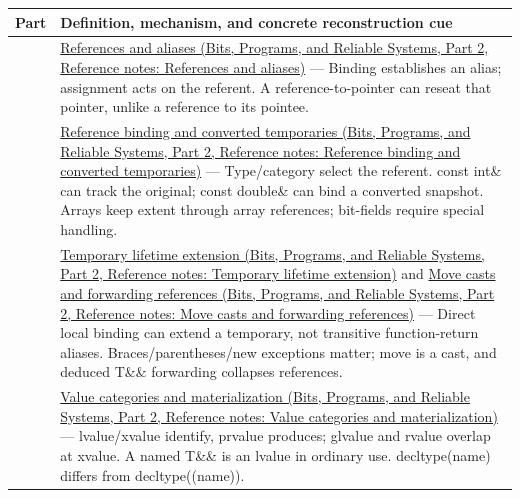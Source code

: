 {\def\LTcaptype{none} %
\begin{longtable}[]{@{}
  >{\raggedright\arraybackslash}p{}
  >{\raggedright\arraybackslash}p{}@{}}
\toprule\noalign{}
\begin{minipage}[b]{\linewidth}\raggedright
Part
\end{minipage} & \begin{minipage}[b]{\linewidth}\raggedright
Definition, mechanism, and concrete reconstruction cue
\end{minipage} \\
\midrule\noalign{}
\endhead
\bottomrule\noalign{}
\endlastfoot
113 & \href{../01-Bits-Programs-and-Reliable-Systems-P02/main.pdf\#nameddest=appendix-d6d562ca9fbb}{References and aliases (Bits, Programs, and Reliable Systems, Part 2, Reference notes: References and aliases)} --- Binding establishes an alias; assignment acts on the referent. A reference-to-pointer can reseat that pointer, unlike a reference to its pointee. \\
114 & \href{../01-Bits-Programs-and-Reliable-Systems-P02/main.pdf\#nameddest=appendix-37856d997bb0}{Reference binding and converted temporaries (Bits, Programs, and Reliable Systems, Part 2, Reference notes: Reference binding and converted temporaries)} --- Type/category select the referent. const int\& can track the original; const double\& can bind a converted snapshot. Arrays keep extent through array references; bit-fields require special handling. \\
115 & \href{../01-Bits-Programs-and-Reliable-Systems-P02/main.pdf\#nameddest=appendix-a978b29bbbb0}{Temporary lifetime extension (Bits, Programs, and Reliable Systems, Part 2, Reference notes: Temporary lifetime extension)} and \href{../01-Bits-Programs-and-Reliable-Systems-P02/main.pdf\#nameddest=appendix-0104b704fb11}{Move casts and forwarding references (Bits, Programs, and Reliable Systems, Part 2, Reference notes: Move casts and forwarding references)} --- Direct local binding can extend a temporary, not transitive function-return aliases. Braces/parentheses/new exceptions matter; move is a cast, and deduced T\&\& forwarding collapses references. \\
116 & \href{../01-Bits-Programs-and-Reliable-Systems-P02/main.pdf\#nameddest=appendix-1121b30eaeb0}{Value categories and materialization (Bits, Programs, and Reliable Systems, Part 2, Reference notes: Value categories and materialization)} --- lvalue/xvalue identify, prvalue produces; glvalue and rvalue overlap at xvalue. A named T\&\& is an lvalue in ordinary use. decltype(name) differs from decltype((name)). \\

\end{longtable}}
